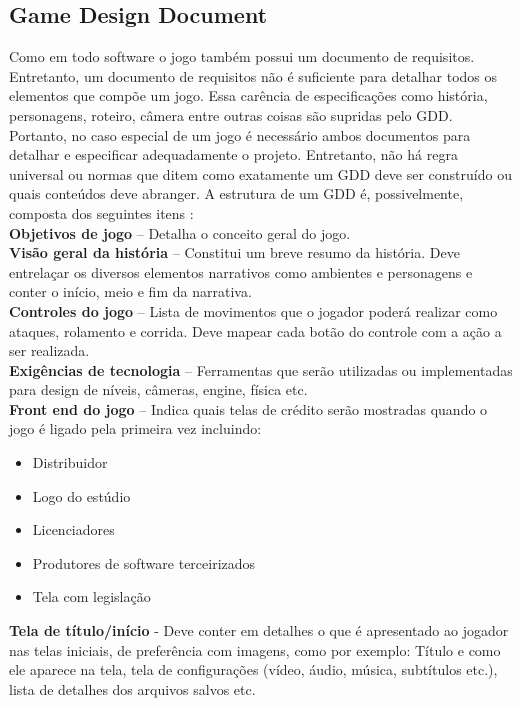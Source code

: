 \documentclass[12pt, 
openright, 
oneside, 
a4paper,    
brazil]{facom-ufu-abntex2}
\begin{document}
\subsection{Game Design Document}
Como em todo software o jogo também possui um documento de requisitos. Entretanto, um documento de requisitos não é suficiente para detalhar todos os elementos que compõe um jogo.  Essa carência de especificações como história, personagens, roteiro, câmera entre outras coisas são supridas pelo GDD.  Portanto, no caso especial de um jogo é necessário ambos documentos para detalhar e especificar adequadamente o projeto. Entretanto, não há regra universal ou normas que ditem como exatamente um GDD deve ser construído ou quais conteúdos deve abranger. A estrutura de um GDD é, possivelmente, composta dos seguintes itens \cite{LevelUp}:\\ %
\textbf{Objetivos de jogo} – Detalha o conceito geral do jogo.\\
\textbf{Visão geral da história} – Constitui um breve resumo da história. Deve entrelaçar os diversos elementos narrativos como ambientes e personagens e conter o início, meio e fim da narrativa. \\
\textbf{Controles do jogo} – Lista de movimentos que o jogador poderá realizar como ataques, rolamento e corrida. Deve mapear cada botão do controle com a ação a ser realizada. \\
\textbf{Exigências de tecnologia} – Ferramentas que serão utilizadas ou implementadas para design de níveis, câmeras, engine, física etc. \\
\textbf{Front end do jogo} – Indica quais telas de crédito serão mostradas quando o jogo é ligado pela primeira vez incluindo: 
	\begin{itemize}
	\item Distribuidor
	\item Logo do estúdio
	\item Licenciadores
	\item Produtores de software terceirizados
	\item Tela com legislação
	\end{itemize}
\textbf{Tela de título/início} - Deve conter em detalhes o que é apresentado ao jogador nas telas iniciais, de preferência com imagens, como por exemplo: Título e como ele aparece na tela, tela de configurações (vídeo, áudio, música, subtítulos etc.), lista de detalhes dos arquivos salvos etc.\\
\end{document}
